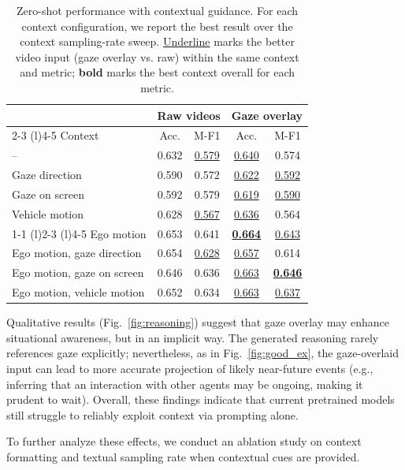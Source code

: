 \documentclass[letterpaper, 10pt, journal]{IEEEtran}  %
\begin{document}
\begin{table}[t]
\small
\centering
\caption{Zero-shot performance with contextual guidance. For each context configuration, we report the best result over the context sampling-rate sweep. \uline{Underline} marks the better video input (gaze overlay vs. raw) within the same context and metric; \textbf{bold} marks the best context overall for each metric.}
\label{tab:zeroshot_context_guided_summary}
\begin{tabular}{l|cc|cc}
\toprule
& \multicolumn{2}{c|}{Raw videos} & \multicolumn{2}{c}{Gaze overlay} \\
\cmidrule(l){2-3} \cmidrule(l){4-5}
Context & Acc. & M-F1 & Acc. & M-F1 \\
\midrule
-- & 0.632 & \uline{0.579} & \uline{0.640} & 0.574 \\
Gaze direction & 0.590 & 0.572 & \uline{0.622} & \uline{0.592} \\
Gaze on screen & 0.592 & 0.579 & \uline{0.619} & \uline{0.590} \\
Vehicle motion & 0.628 & \uline{0.567} & \uline{0.636} & 0.564 \\
\cmidrule(r){1-1} \cmidrule(l){2-3} \cmidrule(l){4-5}
Ego motion & 0.653 & 0.641 & \uline{\textbf{0.664}} & \uline{0.643} \\
Ego motion, gaze direction & 0.654 & \uline{0.628} & \uline{0.657} & 0.614 \\
Ego motion, gaze on screen & 0.646 & 0.636 & \uline{0.663} & \uline{\textbf{0.646}} \\
Ego motion, vehicle motion & 0.652 & 0.634 & \uline{0.663} & \uline{0.637} \\
\bottomrule
\end{tabular}
\end{table}



Qualitative results (Fig.~\ref{fig:reasoning}) suggest that gaze overlay may enhance situational awareness, but in an implicit way. The generated reasoning rarely references gaze explicitly; nevertheless, as in Fig.~\ref{fig:good_ex}, the gaze-overlaid input can lead to more accurate projection of likely near-future events (e.g., inferring that an interaction with other agents may be ongoing, making it prudent to wait). Overall, these findings indicate that current pretrained models still struggle to reliably exploit context via prompting alone.

To further analyze these effects, we conduct an ablation study on context formatting and textual sampling rate when contextual cues are provided.
\end{document}
